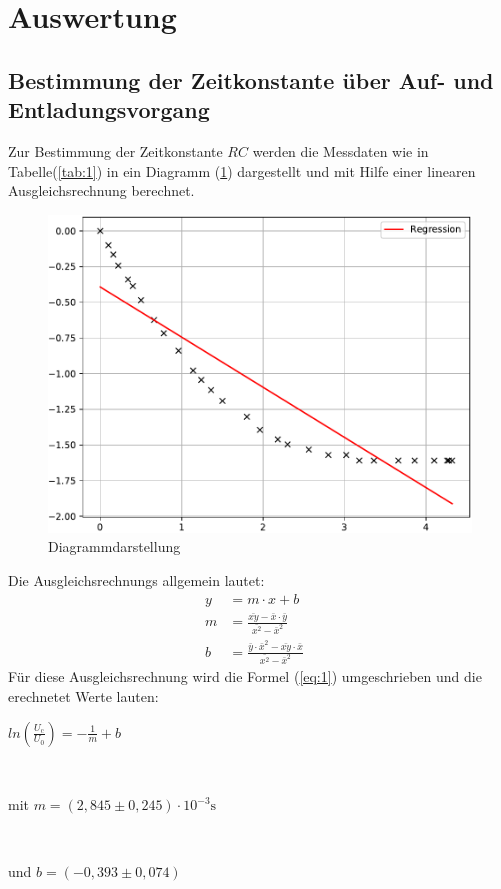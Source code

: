 
\section{Auswertung}
\subsection{Bestimmung der Zeitkonstante über Auf- und Entladungsvorgang}
Zur Bestimmung der Zeitkonstante $RC$ werden die Messdaten wie in Tabelle(\ref{tab:1})
in ein Diagramm (\ref{fig:1}) dargestellt und mit Hilfe einer linearen Ausgleichsrechnung
berechnet.

\begin{figure}[H]
  \centering
  \includegraphics[width=\textwidth]{Diagramm1.pdf}
  \caption{Diagrammdarstellung}
  \label{fig:1}
\end{figure}
Die Ausgleichsrechnungs allgemein lautet:
\begin{align}
  y & = m \cdot x + b \label{eq:}\\
  m & = \frac {\bar{xy} - \bar{x} \cdot \bar{y}} {\bar{x^2} -\bar{x}^2}&  \label{eq:}\\
  b & = \frac {\bar{y} \cdot \bar{x}^2 - \bar{xy} \cdot \bar{x}} {\bar{x^2}-\bar{x}^2}& \label{eq:}
\end{align}
Für diese Ausgleichsrechnung wird die Formel (\ref{eq:1}) umgeschrieben und die erechnetet Werte lauten: \\
\newline
\centerline{$ln(\frac{U_\text{c}}{U_\text{0}}) = -\frac{1}{m} + b$}\\
\newline
\centerline{mit $m = (2,845 \pm 0,245) \cdot 10^{-3} \si{\second}$}\\
\newline
\centerline{und $b = (-0,393 \pm 0,074)$}
\newline
